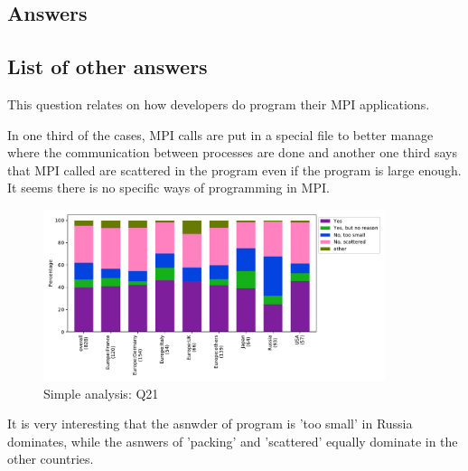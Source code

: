 
\subsection{Answers}


\subsection{List of other answers}
\begin{itemize}

\end{itemize}

This question relates on how developers do program their MPI applications. 

In one third of the cases, MPI calls are put in a special file to better manage
where the communication between processes are done and another one third says that
MPI called are scattered in the program even if the program is large enough. It
seems there is no specific ways of programming in MPI. 

\begin{figure}[htb]
\begin{center}
\includegraphics[width=10cm]{../pdfs/Q21.pdf}
\caption{Simple analysis: Q21}
\label{fig:Q21}
\end{center}
\end{figure}



It is very interesting that the asnwder of program is 'too small' in
Russia dominates, while the asnwers of 'packing' and 'scattered'
equally dominate in the other countries. 
